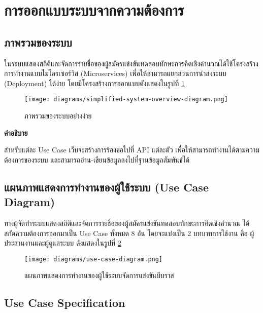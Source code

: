 \newpage

\section{การออกแบบระบบจากความต้องการ}
\subsection{ภาพรวมของระบบ}

ในระบบแสดงสถิติและจัดการรายชื่อของผู้สมัครแข่งขันทดสอบทักษะการคิดเชิงคำนวณได้ใช้โครงสร้างการทำงานแบบไมโครเซอร์วิส (Microservices) \cite{WhatAreMicroservices} เพื่อให้สามารถแยกส่วนการนำส่งระบบ (Deployment) ได้ง่าย โดยมีโครงสร้างการออกแบบดังแสดงในรูปที่ \ref{fig:simplified-system-overview-diagram}

\begin{figure}[H]
    \centering
    \texttt{[image: diagrams/simplified-system-overview-diagram.png]}
    \caption{ภาพรวมของระบบอย่างง่าย}
    \label{fig:simplified-system-overview-diagram}
\end{figure}

\textbf{คำอธิบาย}

สำหรับแต่ละ Use Case เว็บจะสร้างการร้องขอไปที่ API แต่ละตัว เพื่อให้สามารถทำงานได้ตามความต้องการของระบบ และสามารถอ่าน-เขียนข้อมูลลงไปที่ฐานข้อมูลสัมพันธ์ได้

\newpage

\subsection{แผนภาพแสดงการทำงานของผู้ใช้ระบบ (Use Case Diagram)}

ทางผู้จัดทำระบบแสดงสถิติและจัดการรายชื่อของผู้สมัครแข่งขันทดสอบทักษะการคิดเชิงคำนวณ ได้สกัดความต้องการออกมาเป็น Use Case ทั้งหมด 8 อัน โดยจะแบ่งเป็น 2 บทบาทการใช้งาน คือ ผู้ประสานงานและผู้ดูแลระบบ ดังแสดงในรูปที่ \ref{fig:use-case-diagram}

\begin{figure}[H]
    \centering
    \texttt{[image: diagrams/use-case-diagram.png]}
    \caption{แผนภาพแสดงการทำงานของผู้ใช้ระบบจัดการแข่งขันบีบราส}
    \label{fig:use-case-diagram}
\end{figure}

\newpage

\subsection{Use Case Specification}

